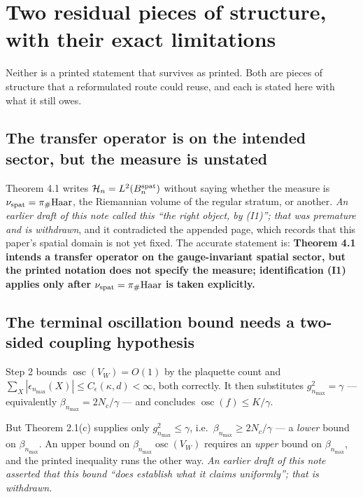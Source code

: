 \documentclass[11pt]{article}
\newcommand{\Hil}{\mathcal H}
\begin{document}
\section{Two residual pieces of structure, with their exact limitations}

Neither is a printed statement that survives as printed. Both are pieces of structure
that a reformulated route could reuse, and each is stated here with what it still owes.

\subsection{The transfer operator is on the intended sector, but the measure is unstated}

Theorem 4.1 writes $\Hil_n=L^2(B^{\rm spat}_n)$ without saying whether the measure is
$\nu_{\rm spat}=\pi_\#\mathrm{Haar}$, the Riemannian volume of the regular stratum, or
another. \emph{An earlier draft of this note called this ``the right object, by
(I1)''; that was premature and is withdrawn}, and it contradicted the appended page,
which records that this paper's spatial domain is not yet fixed. The accurate
statement is: \textbf{Theorem 4.1 intends a transfer operator on the gauge-invariant
spatial sector, but the printed notation does not specify the measure; identification
(I1) applies only after $\nu_{\rm spat}=\pi_\#\mathrm{Haar}$ is taken explicitly.}

\subsection{The terminal oscillation bound needs a two-sided coupling hypothesis}

Step 2 bounds $\operatorname{osc}(V_W)=O(1)$ by the plaquette count and
$\sum_X|\epsilon_{n_{\max}}(X)|\le C_\epsilon(\kappa,d)<\infty$, both correctly. It
then substitutes $g^2_{n_{\max}}=\gamma$ --- equivalently
$\beta_{n_{\max}}=2N_c/\gamma$ --- and concludes $\operatorname{osc}(f)\le K/\gamma$.

But Theorem 2.1(c) supplies only $g^2_{n_{\max}}\le\gamma$, i.e.\
$\beta_{n_{\max}}\ge 2N_c/\gamma$ --- a \emph{lower} bound on $\beta_{n_{\max}}$. An
upper bound on $\beta_{n_{\max}}\operatorname{osc}(V_W)$ requires an \emph{upper} bound
on $\beta_{n_{\max}}$, and the printed inequality runs the other way. \emph{An earlier
draft of this note asserted that this bound ``does establish what it claims
uniformly''; that is withdrawn.}
\end{document}
